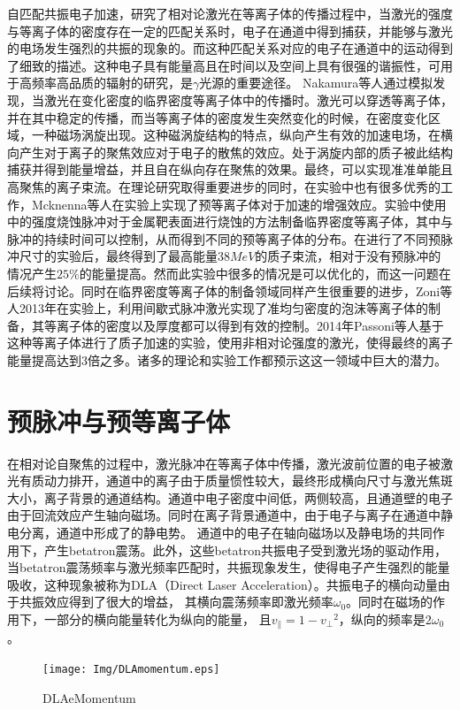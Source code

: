 自匹配共振电子加速，研究了相对论激光在等离子体的传播过程中，当激光的强度与等离子体的密度存在一定的匹配关系时，电子在通道中得到捕获，并能够与激光的电场发生强烈的共振的现象的。而这种匹配关系对应的电子在通道中的运动得到了细致的描述。这种电子具有能量高且在时间以及空间上具有很强的谐振性，可用于高频率高品质的辐射的研究，是$\gamma$光源的重要途径。 Nakamura等人通过模拟发现，当激光在变化密度的临界密度等离子体中的传播时。激光可以穿透等离子体，并在其中稳定的传播，而当等离子体的密度发生突然变化的时候，在密度变化区域，一种磁场涡旋出现。这种磁涡旋结构的特点，纵向产生有效的加速电场，在横向产生对于离子的聚焦效应对于电子的散焦的效应。处于涡旋内部的质子被此结构捕获并得到能量增益，并且自在纵向存在聚焦的效果。最终，可以实现准准单能且高聚焦的离子束流。在理论研究取得重要进步的同时，在实验中也有很多优秀的工作，Mcknenna等人在实验上实现了预等离子体对于加速的增强效应。实验中使用中的强度烧蚀脉冲对于金属靶表面进行烧蚀的方法制备临界密度等离子体，其中与脉冲的持续时间可以控制，从而得到不同的预等离子体的分布。在进行了不同预脉冲尺寸的实验后，最终得到了最高能量38$MeV$的质子束流，相对于没有预脉冲的情况产生$25 \%$的能量提高。然而此实验中很多的情况是可以优化的，而这一问题在后续将讨论。同时在临界密度等离子体的制备领域同样产生很重要的进步，Zoni等人2013年在实验上，利用间歇式脉冲激光实现了准均匀密度的泡沫等离子体的制备，其等离子体的密度以及厚度都可以得到有效的控制。2014年Passoni等人基于这种等离子体进行了质子加速的实验，使用非相对论强度的激光，使得最终的离子能量提高达到3倍之多。诸多的理论和实验工作都预示这这一领域中巨大的潜力。



\section{预脉冲与预等离子体}



在相对论自聚焦的过程中，激光脉冲在等离子体中传播，激光波前位置的电子被激光有质动力排开，通道中的离子由于质量惯性较大，最终形成横向尺寸与激光焦斑大小，离子背景的通道结构。通道中电子密度中间低，两侧较高，且通道壁的电子由于回流效应产生轴向磁场。同时在离子背景通道中，由于电子与离子在通道中静电分离，通道中形成了的静电势。
通道中的电子在轴向磁场以及静电场的共同作用下，产生betatron震荡。此外，这些betatron共振电子受到激光场的驱动作用，当betatron震荡频率与激光频率匹配时，共振现象发生，使得电子产生强烈的能量吸收，这种现象被称为DLA（Direct Laser Acceleration）。共振电子的横向动量由于共振效应得到了很大的增益， 其横向震荡频率即激光频率$\omega_0$。同时在磁场的作用下，一部分的横向能量转化为纵向的能量， 且$v_{\parallel} = 1- {v_{\perp}}^2$，纵向的频率是$2 \omega_0$。
\begin{figure}[!htbp]
  \centering
  \texttt{[image: Img/DLAmomentum.eps]}
  \caption{DLAeMomentum}
  \label{fig:selffousing}
\end{figure}

